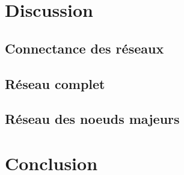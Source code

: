 \documentclass[12pt]{article}
\begin{document}

%






\pagebreak 


\section{Discussion}


\subsection*{Connectance des réseaux}


\subsection*{Réseau complet}


\subsection*{Réseau des noeuds majeurs}


\section{Conclusion}

\pagebreak



\end{document}
